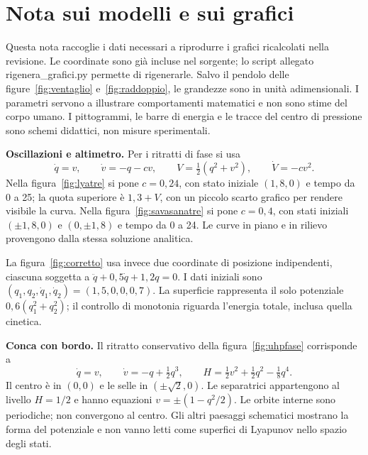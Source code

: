 \documentclass[11pt,a4paper,twoside=false,headinclude,footinclude]{scrartcl}
\begin{document}
\section*{Nota sui modelli e sui grafici}

Questa nota raccoglie i dati necessari a riprodurre i grafici ricalcolati nella revisione. Le coordinate sono già incluse nel sorgente; lo script allegato \textsf{rigenera\_grafici.py} permette di rigenerarle. Salvo il pendolo delle figure~\ref{fig:ventaglio} e~\ref{fig:raddoppio}, le grandezze sono in unità adimensionali. I parametri servono a illustrare comportamenti matematici e non sono stime del corpo umano. I pittogrammi, le barre di energia e le tracce del centro di pressione sono schemi didattici, non misure sperimentali.

\begin{formule}
\textbf{Oscillazioni e altimetro.} Per i ritratti di fase si usa
\[
 \dot q=v,\qquad \dot v=-q-cv,\qquad
 V=\tfrac12(q^2+v^2),\qquad \dot V=-cv^2.
\]
Nella figura~\ref{fig:lyatre} si pone $c=0{,}24$, con stato iniziale $(1{,}8,0)$ e tempo da 0 a 25; la quota superiore è $1{,}3+V$, con un piccolo scarto grafico per rendere visibile la curva. Nella figura~\ref{fig:savasanatre} si pone $c=0{,}4$, con stati iniziali $(\pm1{,}8,0)$ e $(0,\pm1{,}8)$ e tempo da 0 a 24. Le curve in piano e in rilievo provengono dalla stessa soluzione analitica.

La figura~\ref{fig:corretto} usa invece due coordinate di posizione indipendenti, ciascuna soggetta a $\ddot q+0{,}5\dot q+1{,}2q=0$. I dati iniziali sono $(q_1,q_2,\dot q_1,\dot q_2)=(1{,}5,0,0,0{,}7)$. La superficie rappresenta il solo potenziale $0{,}6(q_1^2+q_2^2)$; il controllo di monotonia riguarda l'energia totale, inclusa quella cinetica.
\end{formule}

\begin{formule}
\textbf{Conca con bordo.} Il ritratto conservativo della figura~\ref{fig:uhpfase} corrisponde a
\[
 \dot q=v,\qquad \dot v=-q+\tfrac12q^3,\qquad
 H=\tfrac12v^2+\tfrac12q^2-\tfrac18q^4.
\]
Il centro è in $(0,0)$ e le selle in $(\pm\sqrt2,0)$. Le separatrici appartengono al livello $H=1/2$ e hanno equazioni $v=\pm(1-q^2/2)$. Le orbite interne sono periodiche; non convergono al centro. Gli altri paesaggi schematici mostrano la forma del potenziale e non vanno letti come superfici di Lyapunov nello spazio degli stati.
\end{formule}
\end{document}
